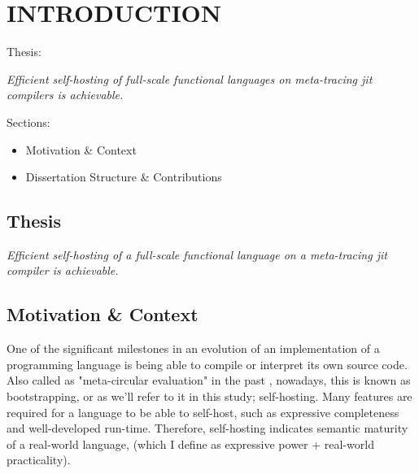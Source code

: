 \chapter[\texorpdfstring{INTRODUCTION}
                          {1. Introduction}]{INTRODUCTION}
    \label{chapter:introduction}

    \begin{chaptersynopsis}

       Thesis:

        \textit{Efficient self-hosting of full-scale functional languages on meta-tracing \gls{jit} compilers is achievable.}

        \vspace{2em}

        Sections:
		\begin{itemize}
			\item Motivation \& Context
			\item Dissertation Structure \& Contributions
		\end{itemize}
    \end{chaptersynopsis}

    \section{Thesis}

    \textit{Efficient self-hosting of a full-scale functional language on a meta-tracing \gls{jit} compiler is achievable.}


    \section[\texorpdfstring{Motivation \& Context}{Context}]{Motivation \& Context}

    \begin{paragraph-here}%
        One of the significant milestones in an evolution of an implementation of a programming language is being able to compile or interpret its own source code. Also called as "meta-circular evaluation" in the past \cite{sicpbook}, nowadays, this is known as bootstrapping, or as we'll refer to it in this study; self-hosting. Many features are required for a language to be able to self-host, such as expressive completeness and well-developed run-time. Therefore, self-hosting indicates semantic maturity of a real-world language, (which I define as expressive power + real-world practicality).
    \end{paragraph-here}

